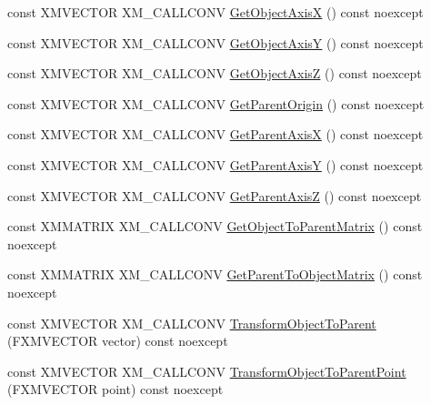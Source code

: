 \begin{DoxyCompactItemize}
\item 
const X\+M\+V\+E\+C\+T\+OR X\+M\+\_\+\+C\+A\+L\+L\+C\+O\+NV \mbox{\hyperlink{classmage_1_1_s_e_t_transform3_d_a208561fa5d00dc7984632c4aa0241a64}{Get\+Object\+AxisX}} () const noexcept
\item 
const X\+M\+V\+E\+C\+T\+OR X\+M\+\_\+\+C\+A\+L\+L\+C\+O\+NV \mbox{\hyperlink{classmage_1_1_s_e_t_transform3_d_a1bb19751799ff543da8237aa883ce9da}{Get\+Object\+AxisY}} () const noexcept
\item 
const X\+M\+V\+E\+C\+T\+OR X\+M\+\_\+\+C\+A\+L\+L\+C\+O\+NV \mbox{\hyperlink{classmage_1_1_s_e_t_transform3_d_a90bb9294cdded695324e9ac8dc889a66}{Get\+Object\+AxisZ}} () const noexcept
\item 
const X\+M\+V\+E\+C\+T\+OR X\+M\+\_\+\+C\+A\+L\+L\+C\+O\+NV \mbox{\hyperlink{classmage_1_1_s_e_t_transform3_d_acfa75ab3397daa920e8fa41429b58cbe}{Get\+Parent\+Origin}} () const noexcept
\item 
const X\+M\+V\+E\+C\+T\+OR X\+M\+\_\+\+C\+A\+L\+L\+C\+O\+NV \mbox{\hyperlink{classmage_1_1_s_e_t_transform3_d_a96989862756316426ddac23f56a0f30f}{Get\+Parent\+AxisX}} () const noexcept
\item 
const X\+M\+V\+E\+C\+T\+OR X\+M\+\_\+\+C\+A\+L\+L\+C\+O\+NV \mbox{\hyperlink{classmage_1_1_s_e_t_transform3_d_ac2c63e65c35f30afe888a2a8c3b45da3}{Get\+Parent\+AxisY}} () const noexcept
\item 
const X\+M\+V\+E\+C\+T\+OR X\+M\+\_\+\+C\+A\+L\+L\+C\+O\+NV \mbox{\hyperlink{classmage_1_1_s_e_t_transform3_d_a5db157206e7244a3fe50f82b80cf0554}{Get\+Parent\+AxisZ}} () const noexcept
\item 
const X\+M\+M\+A\+T\+R\+IX X\+M\+\_\+\+C\+A\+L\+L\+C\+O\+NV \mbox{\hyperlink{classmage_1_1_s_e_t_transform3_d_a23a0d9a7ce94351117484683588cb2b6}{Get\+Object\+To\+Parent\+Matrix}} () const noexcept
\item 
const X\+M\+M\+A\+T\+R\+IX X\+M\+\_\+\+C\+A\+L\+L\+C\+O\+NV \mbox{\hyperlink{classmage_1_1_s_e_t_transform3_d_a82df0310b9963f106e11b8bb6ad49a1d}{Get\+Parent\+To\+Object\+Matrix}} () const noexcept
\item 
const X\+M\+V\+E\+C\+T\+OR X\+M\+\_\+\+C\+A\+L\+L\+C\+O\+NV \mbox{\hyperlink{classmage_1_1_s_e_t_transform3_d_a2bdc5a43f5710839d896c13f3ebc5885}{Transform\+Object\+To\+Parent}} (F\+X\+M\+V\+E\+C\+T\+OR vector) const noexcept
\item 
const X\+M\+V\+E\+C\+T\+OR X\+M\+\_\+\+C\+A\+L\+L\+C\+O\+NV \mbox{\hyperlink{classmage_1_1_s_e_t_transform3_d_af6985066fa275561add80a83a5c32d3e}{Transform\+Object\+To\+Parent\+Point}} (F\+X\+M\+V\+E\+C\+T\+OR point) const noexcept

\end{DoxyCompactItemize}
